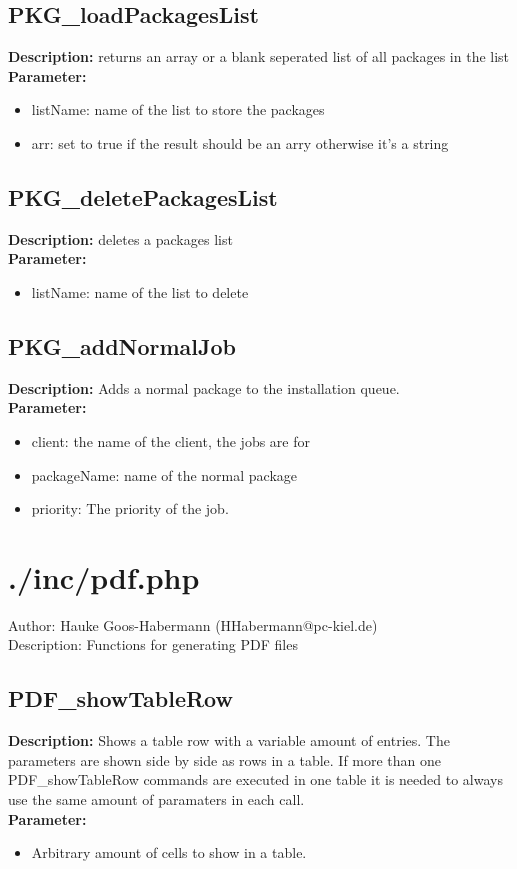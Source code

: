 \subsection{PKG\_loadPackagesList}
\textbf{Description:} returns an array or a blank seperated list of all packages in the list\\
\textbf{Parameter:}
\begin{itemize}
\item listName: name of the list to store the packages 
\item arr: set to true if the result should be an arry otherwise it's a string
\end{itemize}

\subsection{PKG\_deletePackagesList}
\textbf{Description:} deletes a packages list\\
\textbf{Parameter:}
\begin{itemize}
\item listName: name of the list to delete
\end{itemize}

\subsection{PKG\_addNormalJob}
\textbf{Description:} Adds a normal package to the installation queue.\\
\textbf{Parameter:}
\begin{itemize}
\item client: the name of the client, the jobs are for
\item packageName: name of the normal package
\item priority: The priority of the job.
\end{itemize}

\newpage\section{./inc/pdf.php}
 Author: Hauke Goos-Habermann (HHabermann@pc-kiel.de)\\
 Description: Functions for generating PDF files\\

\subsection{PDF\_showTableRow}
\textbf{Description:} Shows a table row with a variable amount of entries. The parameters are shown side by side as rows in a table. If more than one PDF\_showTableRow commands are executed in one table it is needed to always use the same amount of paramaters in each call.\\
\textbf{Parameter:}
\begin{itemize}
\item Arbitrary amount of cells to show in a table.
\end{itemize}


